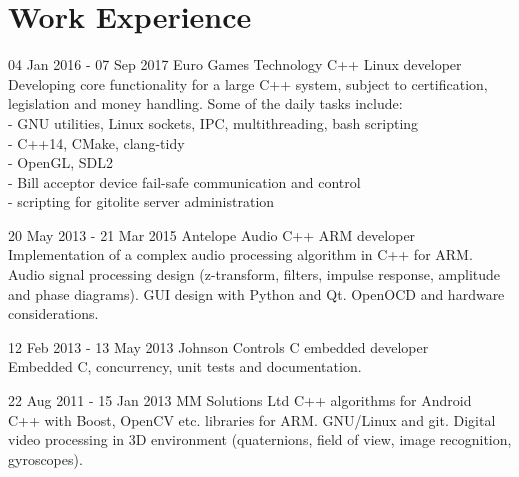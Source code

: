 \documentclass{tccv}
\begin{document}
\section{Work Experience}
\begin{eventlist}
\item{04 Jan 2016 - 07 Sep 2017}
     {Euro Games Technology}
     {C++ Linux developer}                                           \\
Developing core functionality for a large C++ system, subject to certification, legislation and money handling.
Some of the daily tasks include:                                     \\
- GNU utilities, Linux sockets, IPC, multithreading, bash scripting  \\
- C++14, CMake, clang-tidy                                           \\
- OpenGL, SDL2                                                       \\
- Bill acceptor device fail-safe communication and control            \\
- scripting for gitolite server administration                       \\

\item{20 May 2013 - 21 Mar 2015}
     {Antelope Audio}
     {C++ ARM developer}              \\
Implementation of a complex audio processing algorithm in C++ for ARM.
Audio signal processing design (z-transform, filters, impulse response, amplitude and phase diagrams).
GUI design with Python and Qt.
OpenOCD and hardware considerations.   \\

\item{12 Feb 2013 - 13 May 2013}
     {Johnson Controls}
     {C embedded developer} \\
Embedded C, concurrency, unit tests and documentation.  \\

\item{22 Aug 2011 - 15 Jan 2013}
     {MM Solutions Ltd}
     {C++ algorithms for Android} \\
C++ with Boost, OpenCV etc. libraries for ARM.
GNU/Linux and git.
Digital video processing in 3D environment (quaternions, field of view, image recognition, gyroscopes).
\end{eventlist}
\end{document}
